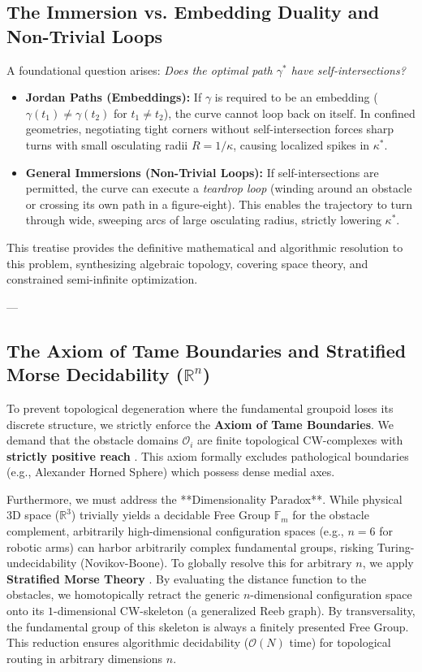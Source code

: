 \documentclass[11pt,reqno]{amsart}
\theoremstyle{definition}
\providecommand{\R}{\mathbb{R}}
\numberwithin{equation}{section}
\providecommand{\R}{\mathbb{R}}
\begin{document}
\subsection{The Immersion vs. Embedding Duality and Non-Trivial Loops}
A foundational question arises: \emph{Does the optimal path $\gamma^*$ have self-intersections?}
\begin{itemize}
    \item \textbf{Jordan Paths (Embeddings):} If $\gamma$ is required to be an embedding ($\gamma(t_1) \neq \gamma(t_2)$ for $t_1 \neq t_2$), the curve cannot loop back on itself. In confined geometries, negotiating tight corners without self-intersection forces sharp turns with small osculating radii $R = 1/\kappa$, causing localized spikes in $\kappa^*$.
    \item \textbf{General Immersions (Non-Trivial Loops):} If self-intersections are permitted, the curve can execute a \emph{teardrop loop} (winding around an obstacle or crossing its own path in a figure-eight). This enables the trajectory to turn through wide, sweeping arcs of large osculating radius, strictly lowering $\kappa^*$.
\end{itemize}

This treatise provides the definitive mathematical and algorithmic resolution to this problem, synthesizing algebraic topology, covering space theory, and constrained semi-infinite optimization.

---

\subsection{The Axiom of Tame Boundaries and Stratified Morse Decidability (\texorpdfstring{$\R^n$}{R\textasciicircum n})}
To prevent topological degeneration where the fundamental groupoid loses its discrete structure, we strictly enforce the \textbf{Axiom of Tame Boundaries}. We demand that the obstacle domains $\mathcal{O}_i$ are finite topological CW-complexes with \textbf{strictly positive reach} \cite{federer1959, langer1985}. This axiom formally excludes pathological boundaries (e.g., Alexander Horned Sphere) which possess dense medial axes.

Furthermore, we must address the **Dimensionality Paradox**. While physical 3D space ($\R^3$) trivially yields a decidable Free Group $\mathbb{F}_m$ for the obstacle complement, arbitrarily high-dimensional configuration spaces (e.g., $n=6$ for robotic arms) can harbor arbitrarily complex fundamental groups, risking Turing-undecidability (Novikov-Boone).
To globally resolve this for arbitrary $n$, we apply \textbf{Stratified Morse Theory} \cite{goresky1988}. By evaluating the distance function to the obstacles, we homotopically retract the generic $n$-dimensional configuration space onto its $1$-dimensional CW-skeleton (a generalized Reeb graph). By transversality, the fundamental group of this skeleton is always a finitely presented Free Group. This reduction ensures algorithmic decidability ($\mathcal{O}(N)$ time) for topological routing in arbitrary dimensions $n$.
 
\end{document}
